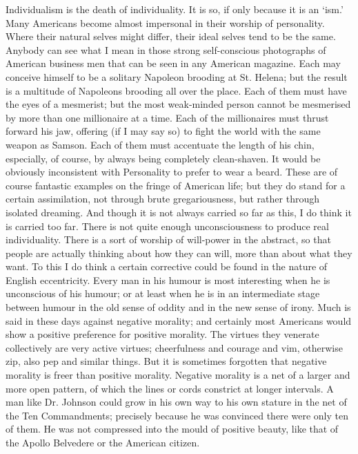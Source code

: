 \documentclass{book}
\begin{document}
Individualism is the death of individuality. It is so, if only because it is an ‘ism.’ Many Americans become almost impersonal in their worship of personality. Where their natural selves might differ, their ideal selves tend to be the same. Anybody can see what I mean in those strong self-conscious photographs of American business men that can be seen in any American magazine. Each may conceive himself to be a solitary Napoleon brooding at St. Helena; but the result is a multitude of Napoleons brooding all over the place. Each of them must have the eyes of a mesmerist; but the most weak-minded person cannot be mesmerised by more than one millionaire at a time. Each of the millionaires must thrust forward his jaw, offering (if I may say so) to fight the world with the same weapon as Samson. Each of them must accentuate the length of his chin, especially, of course, by always being completely clean-shaven. It would be obviously inconsistent with Personality to prefer to wear a beard. These are of course fantastic examples on the fringe of American life; but they do stand for a certain assimilation, not through brute gregariousness, but rather through isolated dreaming. And though it is not always carried so far as this, I do think it is carried too far. There is not quite enough unconsciousness to produce real individuality. There is a sort of worship of will-power in the abstract, so that people are actually thinking about how they can will, more than about what they want. To this I do think a certain corrective could be found in the nature of English eccentricity. Every man in his humour is most interesting when he is unconscious of his humour; or at least when he is in an intermediate stage between humour in the old sense of oddity and in the new sense of irony. Much is said in these days against negative morality; and certainly most Americans would show a positive preference for positive morality. The virtues they venerate collectively are very active virtues; cheerfulness and courage and vim, otherwise zip, also pep and similar things. But it is sometimes forgotten that negative morality is freer than positive morality. Negative morality is a net of a larger and more open pattern, of which the lines or cords constrict at longer intervals. A man like Dr. Johnson could grow in his own way to his own stature in the net of the Ten Commandments; precisely because he was convinced there were only ten of them. He was not compressed into the mould of positive beauty, like that of the Apollo Belvedere or the American citizen.
\end{document}
